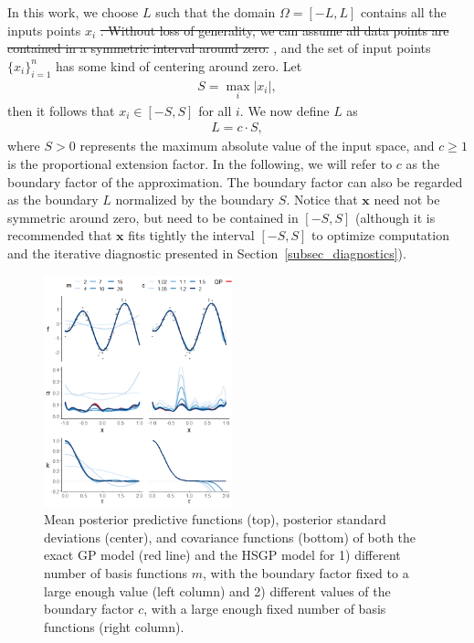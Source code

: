 In this work, we choose $L$ such that the domain $\Omega = \left[-L, L\right]$ contains all the inputs points $x_i$
\st{. Without loss of generality, we can assume all data points are contained in a symmetric interval around zero.}
{\color{blue}, and the set of input points $\{x_i\}_{i=1}^n$ has some kind of centering around zero.}
Let 
%
\begin{align}\label{eq_boundary_S}
S=\max_{i}|x_i|, 
\end{align}
%
then it follows that $x_i \in \left[-S, S\right]$ for all $i$. We now define $L$ as
%
\begin{align}\label{eq_boundary}
L=c \cdot S,
\end{align} 
%
where $S > 0$ represents  
{\color{blue}the maximum absolute value of the input space}, 
and $c \geq 1$ is the proportional extension factor. In the following, we will refer to $c$ as the boundary factor of the approximation. The boundary factor can also be regarded as the boundary $L$ normalized by 
{\color{blue}the boundary $S$}. 
{\color{blue}Notice that $\bm{x}$ need not be symmetric around zero, but need to be contained in $\left[-S, S\right]$} (although it is recommended that $\bm{x}$ fits tightly the interval $\left[-S, S\right]$ to optimize computation and the iterative diagnostic presented in Section~\ref{subsec_diagnostics}).

\begin{figure}
\includegraphics[width=0.485\textwidth, trim = 2mm 0mm 0mm 0mm, clip]{fig1_Post_J_L.png}
\vspace{-1mm}
\caption{Mean posterior predictive functions (top), posterior standard deviations (center), and covariance functions (bottom) of both the exact GP model (red line) and the HSGP model for 1) different number of basis functions $m$, with the boundary factor fixed to a large enough value (left column) and 2) different values of the boundary factor $c$, with a large enough fixed number of basis functions (right column).}
  \label{fig1_Post_J_L}
\end{figure}

